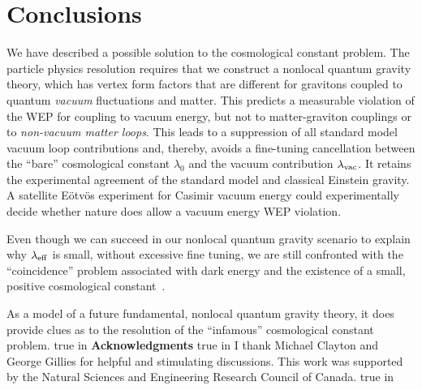 \documentclass[a4paper,12pt]{article}
\begin{document}
\section{\bf Conclusions}

We have described a possible solution to the cosmological
constant problem. The particle physics resolution requires that we
construct a nonlocal quantum gravity theory, which has vertex form factors
that are different for gravitons coupled to quantum {\it vacuum}
fluctuations and matter. This predicts a measurable violation of the WEP
for coupling to vacuum energy, but not to matter-graviton couplings or to
{\it non-vacuum matter loops}. This leads to a suppression of all standard
model vacuum loop contributions and, thereby, avoids a fine-tuning
cancellation between the ``bare'' cosmological constant $\lambda_0$ and
the vacuum contribution $\lambda_{\rm vac}$. It retains the experimental
agreement of the standard model and classical Einstein gravity. A
satellite E\"otv\"os experiment for Casimir vacuum energy could
experimentally decide whether nature does allow a vacuum energy WEP
violation.

Even though we can succeed in our nonlocal quantum gravity scenario to
explain why $\lambda_{\rm eff}$ is small, without excessive fine tuning, we
are still confronted with the ``coincidence'' problem associated with
dark energy and the existence of a small, positive cosmological
constant~\cite{Straumann}.

As a model of a future fundamental, nonlocal
quantum gravity theory, it does provide clues as to the resolution of the
``infamous'' cosmological constant problem.
 true in
{\bf Acknowledgments}
 true in
I thank Michael Clayton and George Gillies for helpful and
stimulating discussions. This work was supported by the Natural Sciences and
Engineering Research Council of Canada.   true in
\end{document}

